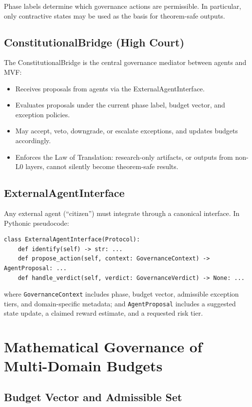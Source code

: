 \documentclass[11pt]{article}
\begin{document}
Phase labels determine which governance actions are permissible. In particular, only contractive states may be used as the basis for theorem-safe outputs.

\subsection{ConstitutionalBridge (High Court)}

The ConstitutionalBridge is the central governance mediator between agents and MVF:

\begin{itemize}[itemsep=2pt]
  \item Receives proposals from agents via the ExternalAgentInterface.
  \item Evaluates proposals under the current phase label, budget vector, and exception policies.
  \item May accept, veto, downgrade, or escalate exceptions, and updates budgets accordingly.
  \item Enforces the Law of Translation: research-only artifacts, or outputs from non-L0 layers, cannot silently become theorem-safe results.
\end{itemize}

\subsection{ExternalAgentInterface}

Any external agent (``citizen'') must integrate through a canonical interface. In Pythonic pseudocode:

\begin{verbatim}
class ExternalAgentInterface(Protocol):
    def identify(self) -> str: ...
    def propose_action(self, context: GovernanceContext) -> AgentProposal: ...
    def handle_verdict(self, verdict: GovernanceVerdict) -> None: ...
\end{verbatim}

where \texttt{GovernanceContext} includes phase, budget vector, admissible exception tiers, and domain-specific metadata; and \texttt{AgentProposal} includes a suggested state update, a claimed reward estimate, and a requested risk tier.

\section{Mathematical Governance of Multi-Domain Budgets}

\subsection{Budget Vector and Admissible Set}
\end{document}
